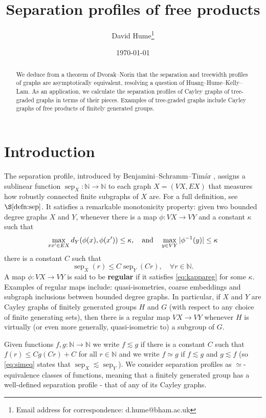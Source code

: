 \documentclass{article}
\title{Separation profiles of free products}
\author{David Hume\thanks{Email address for correspondence: d.hume@bham.ac.uk}}
\affil{University of Birmingham, UK}
\date{\today}
\numberwithin{equation}{section}
\theoremstyle{definition}
\theoremstyle{citing}
\DeclareMathOperator{\sep}{sep}
\newcommand{\N}{\mathbb{N}}
\numberwithin{equation}{section}
\begin{document}
\maketitle

\begin{abstract}
We deduce from a theorem of Dvorak--Norin that the separation and treewidth profiles of graphs are asymptotically equivalent, resolving a question of Huang--Hume--Kelly--Lam. As an application, we calculate the separation profiles of Cayley graphs of tree-graded graphs in terms of their pieces. Examples of tree-graded graphs include Cayley graphs of free products of finitely generated groups.
\end{abstract}

\section{Introduction}
The separation profile, introduced by Benjamini--Schramm--Tim\'ar \cite{BenSchTim-12-separation-graphs}, assigns a sublinear function $\sep_X:\N\to\N$ to each graph $X=(VX,EX)$ that measures how robustly connected finite subgraphs of $X$ are. For a full definition, see $\S\ref{defn:sep}$. It satisfies a remarkable monotonicity property: given two bounded degree graphs $X$ and $Y$, whenever there is a map $\phi:VX\to VY$ and a constant $\kappa$ such that 
\begin{equation}\label{eq:kappareg}
\max_{xx'\in EX} d_Y(\phi(x),\phi(x'))\leq \kappa, \quad \textup{and} \quad \max_{y\in VY}|\phi^{-1}(y)|\leq\kappa    
\end{equation}
there is a constant $C$ such that
\begin{equation}\label{eq:simeq}
    \sep_X(r) \leq C\sep_Y(Cr),\quad \forall r\in \N.
\end{equation}
A map $\phi:VX\to VY$ is said to be \textbf{regular} if it satisfies \eqref{eq:kappareg} for some $\kappa$. Examples of regular maps include: quasi-isometries, coarse embeddings and subgraph inclusions between bounded degree graphs. In particular, if $X$ and $Y$ are Cayley graphs of finitely generated groups $H$ and $G$ (with respect to any choice of finite generating sets), then there is a regular map $VX\to VY$ whenever $H$ is virtually (or even more generally, quasi-isometric to) a subgroup of $G$.

Given functions $f,g:\N\to\N$ we write $f\lesssim g$ if there is a constant $C$ such that $f(r)\leq Cg(Cr)+C$ for all $r\in\N$ and we write $f\simeq g$ if $f\lesssim g$ and $g\lesssim f$ (so \eqref{eq:simeq} states that $\sep_X\lesssim \sep_Y$). We consider separation profiles as $\simeq$-equivalence classes of functions, meaning that a finitely generated group has a well-defined separation profile - that of any of its Cayley graphs.
\end{document}
